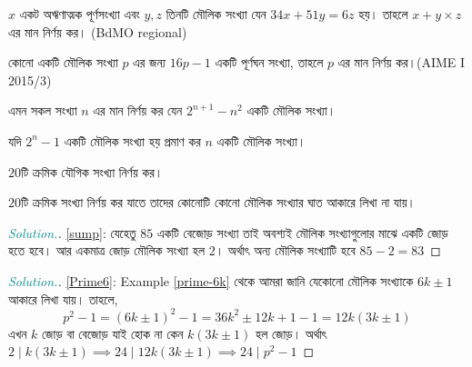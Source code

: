 \documentclass[a4paper,11pt]{article}
\newenvironment{sltn}{\begin{proof}[\emph{\textcolor{darkcyan}{Solution.}}]} {\end{proof}}
\begin{document}
\begin{Exercise}
\begin{prob}
\begin{center}
		\end{center}
	\end{prob}
	\begin{prob}
		$x$ একট অঋণাত্মক পূর্ণসংখ্যা এবং $y,z$ তিনটি মৌলিক সংখ্যা যেন $34x+51y=6z$ হয়। তাহলে $x+y\times z$ এর মান নির্ণয় কর। (BdMO regional) 
	\end{prob}
	\begin{prob}
		কোনো একটি মৌলিক সংখ্যা $p$ এর জন্য $16p-1$ একটি পূর্ণঘন সংখ্যা, তাহলে $p$ এর মান নির্ণয় কর।(AIME I 2015/3)
	\end{prob}
	\begin{prob}
		এমন সকল সংখ্যা $n$ এর মান নির্ণয় কর যেন $2^{n+1}-n^2$ একটি মৌলিক সংখ্যা।  
	\end{prob}
	\begin{prob}
		যদি $2^n-1$ একটি মৌলিক সংখ্যা হয় প্রমাণ কর $n$ একটি মৌলিক সংখ্যা। 
	\end{prob}
	\begin{prob}
		$20$টি ক্রমিক যৌগিক সংখ্যা নির্ণয় কর।  
	\end{prob}
	\begin{prob}
		$20$টি ক্রমিক সংখ্যা নির্ণয় কর যাতে তাদের কোনোটি কোনো মৌলিক সংখ্যার ঘাত আকারে লিখা না যায়।
	\end{prob}
\end{Exercise}
\begin{Answer}[ref={xr-3}]
	\begin{sltn} \ref{sump}: যেহেতু $85$ একটি বেজোড় সংখ্যা তাই অবশ্যই মৌলিক সংখ্যাগুলোর মাঝে একটি জোড় হতে হবে। আর একমাত্র জোড় মৌলিক সংখ্যা হল $2$। অর্থাৎ অন্য মৌলিক সংখ্যাটি হবে $85-2=83$
	\end{sltn}
	\begin{sltn} \ref{Prime6}:
		Example \ref{prime-6k} থেকে আমরা জানি যেকোনো মৌলিক সংখ্যাকে $6k \pm 1$ আকারে লিখা যায়। তাহলে, 
		\[p^2-1=(6k \pm 1)^2-1=36k^2 \pm 12k+1-1=12k(3k\pm 1)\]
		এখন $k$ জোড় বা বেজোড় যাই হোক না কেন $k(3k \pm 1)$ হল জোড়। অর্থাৎ $2 \mid k(3k \pm 1) \implies 24 \mid 12k(3k \pm 1) \implies 24 \mid p^2-1$
	\end{sltn}
\end{Answer}
\newpage 
\end{document}
